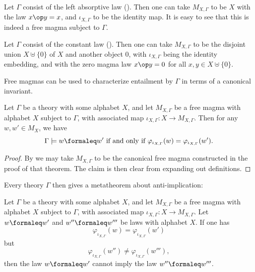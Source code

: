 \begin{example}\label{freeleft}
  Let $\Gamma$ consist of the left absorptive law (). Then one can take $M_{X,\Gamma}$ to be $X$ with the law $x \op y = x$, and $\iota_{X,\Gamma}$ to be the identity map. It is easy to see that this is indeed a free magma subject to $\Gamma$.
\end{example}

\begin{example}\label{freeconst}
  Let $\Gamma$ consist of the constant law (). Then one can take $M_{X,\Gamma}$ to be the disjoint union $X \uplus \{0\}$ of $X$ and another object $0$, with $\iota_{X,\Gamma}$ being the identity embedding, and with the zero magma law $x \op y = 0$ for all $x,y \in X \uplus \{0\}$.
\end{example}

Free magmas can be used to characterize entailment by $\Gamma$ in terms of a canonical invariant.

\begin{theorem}\label{canonical-invariant}
  Let $\Gamma$ be a theory with some alphabet $X$, and let $M_{X,\Gamma}$ be a free magma with alphabet $X$ subject to $\Gamma$, with associated map $\iota_{X,\Gamma}: X \to M_{X,\Gamma}$. Then for any $w,w' \in M_X$, we have
  \[
  \Gamma \models w \formaleq w' \text{ if and only if } \varphi_{\iota_{X,\Gamma}}(w) = \varphi_{\iota_{X,\Gamma}}(w').
  \]
\end{theorem}

\begin{proof}
  By  we may take $M_{X,\Gamma}$ to be the canonical free magma constructed in the proof of that theorem. The claim is then clear from expanding out definitions.
\end{proof}

Every theory $\Gamma$ then gives a metatheorem about anti-implication:

\begin{corollary}\label{anti-impl}
  Let $\Gamma$ be a theory with some alphabet $X$, and let $M_{X,\Gamma}$ be a free magma with alphabet $X$ subject to $\Gamma$, with associated map $\iota_{X,\Gamma}: X \to M_{X,\Gamma}$. Let $w \formaleq w'$ and $w'' \formaleq w'''$ be laws with alphabet $X$. If one has
  \[
  \varphi_{\iota_{X,\Gamma}}(w) = \varphi_{\iota_{X,\Gamma}}(w')
  \]
  but
  \[
  \varphi_{\iota_{X,\Gamma}}(w'') \neq \varphi_{\iota_{X,\Gamma}}(w'''),
  \]
  then the law $w \formaleq w'$ cannot imply the law $w'' \formaleq w'''$.
\end{corollary}

